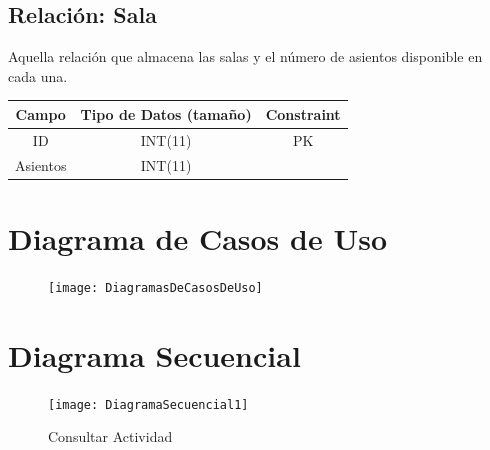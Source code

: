 \documentclass[12pt, fleqn]{report}                             %
\begin{document}
        \subsection*{Relación: Sala}

            Aquella relación que almacena las salas y el número de asientos disponible
            en cada una.

            \vspace{2em}

            \small{
            \begin{tabular}{| c | c | c |}
                \hline
                \textbf{Campo} & \textbf{Tipo de Datos (tamaño)} & \textbf{Constraint} \\[0.5ex] 
                \hline\hline
                
                ID          & INT(11)       & PK                    \\
                Asientos    & INT(11)       &                       \\
                \hline
            \end{tabular}
            }










    \clearpage
    \section{Diagrama de Casos de Uso}

        \begin{figure}[h]
            \centering
            \texttt{[image: DiagramasDeCasosDeUso]}
        \end{figure}

    \clearpage
    \section{Diagrama Secuencial}


        \begin{figure}[ht]
            \centering
            \texttt{[image: DiagramaSecuencial1]}
            \caption{Consultar Actividad}
        \end{figure}
\end{document}
